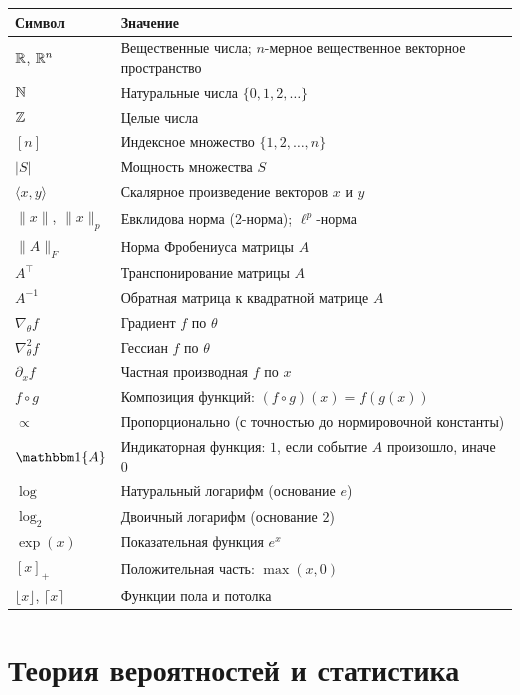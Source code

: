 \begin{center}
\begin{tabular}{@{}ll@{}}
\toprule
\textbf{Символ} & \textbf{Значение} \\
\midrule
$\mathbb{R}$, $\mathbb{R}^n$ & Вещественные числа; $n$-мерное вещественное векторное пространство \\
$\mathbb{N}$         & Натуральные числа $\{0,1,2,\ldots\}$ \\
$\mathbb{Z}$         & Целые числа \\
$[n]$        & Индексное множество $\{1,2,\ldots,n\}$ \\
$|S|$        & Мощность множества $S$ \\
$\langle x, y\rangle$ & Скалярное произведение векторов $x$ и $y$ \\
$\|x\|$, $\|x\|_p$   & Евклидова норма (2-норма); $\ell^p$-норма \\
$\|A\|_F$    & Норма Фробениуса матрицы $A$ \\
$A^\top$     & Транспонирование матрицы $A$ \\
$A^{-1}$     & Обратная матрица к квадратной матрице $A$ \\
$\nabla_\theta f$ & Градиент $f$ по $\theta$ \\
$\nabla^2_\theta f$ & Гессиан $f$ по $\theta$ \\
$\partial_x f$ & Частная производная $f$ по $x$ \\
$f \circ g$  & Композиция функций: $(f\circ g)(x)=f(g(x))$ \\
$\propto$    & Пропорционально (с точностью до нормировочной константы) \\
$\ind\{A\}$  & Индикаторная функция: $1$, если событие $A$ произошло, иначе $0$ \\
$\log$       & Натуральный логарифм (основание $e$) \\
$\log_2$     & Двоичный логарифм (основание $2$) \\
$\exp(x)$    & Показательная функция $e^x$ \\
$[x]_+$      & Положительная часть: $\max(x,0)$ \\
$\lfloor x \rfloor$, $\lceil x \rceil$ & Функции пола и потолка \\
\bottomrule
\end{tabular}
\end{center}

\section*{Теория вероятностей и статистика}

